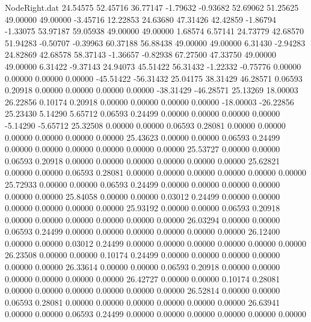 \begin{filecontents}{NodeRight.dat}
  24.54575   52.45716   36.77147    -1.79632   -0.93682   52.69062   51.25625   49.00000   49.00000   -3.45716   12.22853
  24.63680   47.31426   42.42859    -1.86794   -1.33075   53.97187   59.05938   49.00000   49.00000    1.68574    6.57141
  24.73779   42.68570   51.94283    -0.50707   -0.39963   60.37188   56.88438   49.00000   49.00000    6.31430   -2.94283
  24.82869   42.68578   58.37143    -1.36657   -0.82938   67.27500   47.33750   49.00000   49.00000    6.31422   -9.37143
  24.94073   45.51422   56.31432    -1.22332   -0.75776    0.00000    0.00000    0.00000    0.00000  -45.51422  -56.31432
  25.04175   38.31429   46.28571     0.06593    0.20918    0.00000    0.00000    0.00000    0.00000  -38.31429  -46.28571
  25.13269   18.00003   26.22856     0.10174    0.20918    0.00000    0.00000    0.00000    0.00000  -18.00003  -26.22856
  25.23430    5.14290    5.65712     0.06593    0.24499    0.00000    0.00000    0.00000    0.00000   -5.14290   -5.65712
  25.32508    0.00000    0.00000     0.06593    0.28081    0.00000    0.00000    0.00000    0.00000    0.00000    0.00000
  25.43623    0.00000    0.00000     0.06593    0.24499    0.00000    0.00000    0.00000    0.00000    0.00000    0.00000
  25.53727    0.00000    0.00000     0.06593    0.20918    0.00000    0.00000    0.00000    0.00000    0.00000    0.00000
  25.62821    0.00000    0.00000     0.06593    0.28081    0.00000    0.00000    0.00000    0.00000    0.00000    0.00000
  25.72933    0.00000    0.00000     0.06593    0.24499    0.00000    0.00000    0.00000    0.00000    0.00000    0.00000
  25.84058    0.00000    0.00000     0.03012    0.24499    0.00000    0.00000    0.00000    0.00000    0.00000    0.00000
  25.93192    0.00000    0.00000     0.06593    0.20918    0.00000    0.00000    0.00000    0.00000    0.00000    0.00000
  26.03294    0.00000    0.00000     0.06593    0.24499    0.00000    0.00000    0.00000    0.00000    0.00000    0.00000
  26.12400    0.00000    0.00000     0.03012    0.24499    0.00000    0.00000    0.00000    0.00000    0.00000    0.00000
  26.23508    0.00000    0.00000     0.10174    0.24499    0.00000    0.00000    0.00000    0.00000    0.00000    0.00000
  26.33614    0.00000    0.00000     0.06593    0.20918    0.00000    0.00000    0.00000    0.00000    0.00000    0.00000
  26.42727    0.00000    0.00000     0.10174    0.28081    0.00000    0.00000    0.00000    0.00000    0.00000    0.00000
  26.52814    0.00000    0.00000     0.06593    0.28081    0.00000    0.00000    0.00000    0.00000    0.00000    0.00000
  26.63941    0.00000    0.00000     0.06593    0.24499    0.00000    0.00000    0.00000    0.00000    0.00000    0.00000

\end{filecontents}
